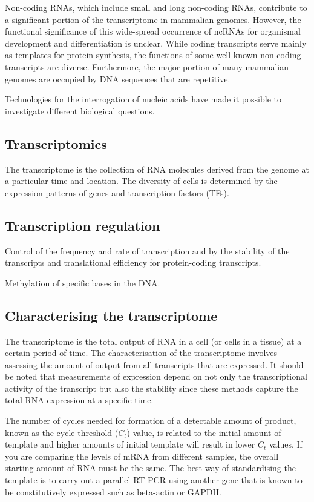 Non-coding RNAs, which include small and long non-coding RNAs, contribute to a significant portion of the transcriptome in mammalian genomes. However, the functional significance of this wide-spread occurrence of ncRNAs for organismal development and differentiation is unclear. While coding transcripts serve mainly as templates for protein synthesis, the functions of some well known non-coding transcripts are diverse. Furthermore, the major portion of many mammalian genomes are occupied by DNA sequences that are repetitive.

Technologies for the interrogation of nucleic acids have made it possible to investigate different biological questions.

\subsection{Transcriptomics}

The transcriptome is the collection of RNA molecules derived from the genome at a particular time and location. The diversity of cells is determined by the expression patterns of genes and transcription factors (TFs).

\subsection{Transcription regulation}

Control of the frequency and rate of transcription and by the stability of the transcripts and translational efficiency for protein-coding transcripts.

Methylation of specific bases in the DNA.

\subsection{Characterising the transcriptome}

 The transcriptome is the total output of RNA in a cell (or cells in a tissue) at a certain period of time. The characterisation of the transcriptome involves assessing the amount of output from all transcripts that are expressed. It should be noted that measurements of expression depend on not only the transcriptional activity of the transcript but also the stability since these methods capture the total RNA expression at a specific time.

The number of cycles needed for formation of a detectable amount of product, known as the cycle threshold ($C_{t}$) value, is related to the initial amount of template and higher amounts of initial template will result in lower $C_{t}$ values. If you are comparing the levels of mRNA from different samples, the overall starting amount of RNA must be the same. The best way of standardising the template is to carry out a parallel RT-PCR using another gene that is known to be constitutively expressed such as beta-actin or GAPDH.

